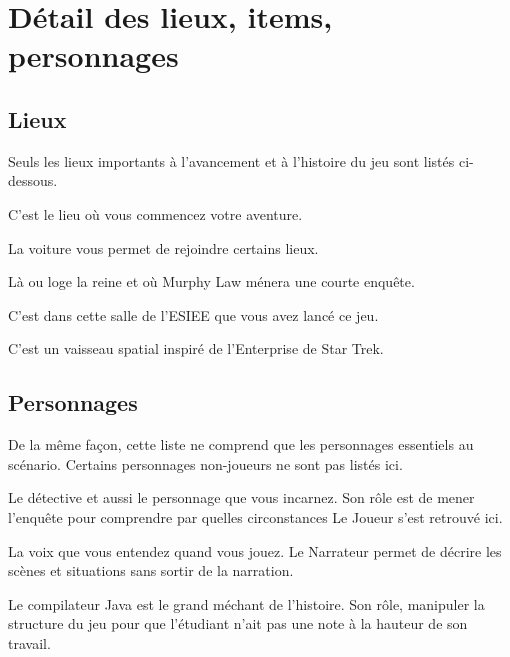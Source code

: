 \section{Détail des lieux, items, personnages}

\subsection{Lieux}

Seuls les lieux importants à l'avancement et à l'histoire du jeu sont listés ci-dessous.

\begin{description}[leftmargin=!,labelwidth=\widthof{\bfseries Palais de Buckingham}]
  \item [Bureau de Murphy] C'est le lieu où vous commencez votre aventure.
  \item [Voiture] La voiture vous permet de rejoindre certains lieux.
  \item [Palais de Buckingham] Là ou loge la reine et où Murphy Law ménera une courte enquête.
  \item [Salle de l'ESIEE] C'est dans cette salle de l'ESIEE que vous avez lancé ce jeu.
  \item [Vaisseau] C'est un vaisseau spatial inspiré de l'Enterprise de Star Trek.
\end{description}

\subsection{Personnages}

De la même façon, cette liste ne comprend que les personnages essentiels au scénario. Certains personnages non-joueurs ne sont pas listés ici.

\begin{description}[leftmargin=!,labelwidth=\widthof{\bfseries Le Compilateur}]
  \item [Murphy Law] Le détective et aussi le personnage que vous incarnez. Son rôle est de mener l'enquête pour comprendre par quelles circonstances Le Joueur s'est retrouvé ici.
  \item [Le Narrateur] La voix que vous entendez quand vous jouez. Le Narrateur permet de décrire les scènes et situations sans sortir de la narration. 
  \item [Le Compilateur] Le compilateur Java est le grand méchant de l'histoire. Son rôle, manipuler la structure du jeu pour que l'étudiant n'ait pas une note à la hauteur de son travail.
\end{description}

